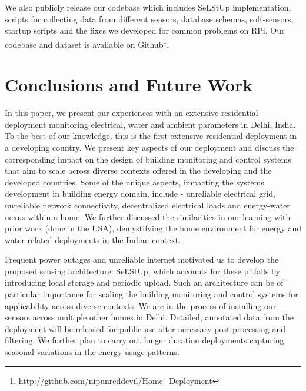 \documentclass[10pt]{sensys-proc}
\newcommand{\selstup}{SeLStUp}
\newcommand{\selstups}{SeLStUp }
\begin{document}
We also publicly release our codebase which includes \selstups implementation, scripts for collecting data from different sensors, database schemas, soft-sensors, startup scripts and the fixes we developed for common problems on RPi. Our codebase and dataset is available on Github\footnote{\url{http://github.com/nipunreddevil/Home_Deployment}}.

\vspace{-1mm}
\section{Conclusions and Future Work}
 In this paper, we present our experiences with an extensive residential deployment monitoring electrical, water and ambient parameters in Delhi, India. To the best of our knowledge, this is the first extensive residential deployment in a developing country. We present key aspects of our deployment and discuss the corresponding impact on the design of building monitoring and control systems that aim to scale across diverse contexts offered in the developing and the developed countries. Some of the unique aspects, impacting the systems development in building energy domain, include - unreliable electrical grid, unreliable network connectivity, decentralized electrical loads and energy-water nexus within a home. We further discussed the similarities in our learning with prior work (done in the USA), demystifying the home environment for energy and water related deployments in the Indian context. %

Frequent power outages and unreliable internet motivated us to develop the proposed sensing architecture: \selstup, which accounts for these pitfalls by introducing local storage and periodic upload. Such an architecture can be of particular importance for scaling the building monitoring and control systems for applicability across diverse contexts. %
We are in the process of installing our sensors across multiple other homes in Delhi. Detailed, annotated data from the deployment will be released for public use after necessary post processing and filtering. We further plan to carry out longer duration deployments capturing seasonal variations in the energy usage patterns. %

\balance
\vspace{-2mm}

 
\end{document}
